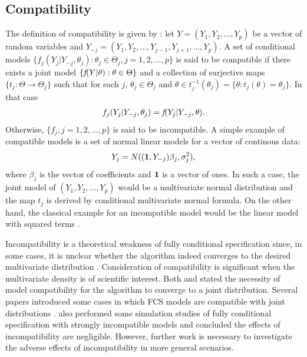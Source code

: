 	\subsection{Compatibility} 
	The definition of compatibility is given by \citet{liu2014stationary}: let $Y = (Y_1, Y_2, \dots, Y_p)$ be a vector of random variables and $Y_{-j} = (Y_1, Y_2, \dots, Y_{j-1}, Y_{j+1}, \dots, Y_{p})$. A set of conditional models $\{f_{j}(Y_j|Y_{-j}, \theta_{j}) : \theta_{j} \in \Theta_{j}, j = 1, 2, \dots, p\}$ is said to be compatible if there exists a joint model $\{\emph{f}(Y|\theta) : \theta \in \Theta\}$ and a collection of surjective maps $\{t_{j} : \Theta \to \Theta_{j}\}$ such that for each $j$, $\theta_{j} \in \Theta_{j}$ and $\theta \in t_{j}^{-1}(\theta_{j}) = \{\theta : t_{j}(\theta) = \theta_{j}\}$. In that case 
	\begin{gather*}
		f_{j}(Y_j|Y_{-j}, \theta_{j}) = \emph{f}(Y_j|Y_{-j}, \theta).
	\end{gather*}
	Otherwise, $\{f_{j}, j = 1, 2, \dots, p\}$ is said to be incompatible.
	A simple example of compatible models is a set of normal linear models for a vector of continous data: 
	\begin{gather*}
		Y_j = N((\textbf1, Y_{-j})\beta_{j}, \sigma_{j}^2), 
	\end{gather*}
	where $\beta_{j}$ is the vector of coefficients and $\textbf1$ is a vector of ones. In such a case, the joint model of $(Y_1, Y_2, \dots, Y_p)$ would be a multivariate normal distribution and the map $t_j$ is derived by conditional multivariate normal formula. On the other hand, the classical example for an incompatible model would be the linear model with squared terms \citep{liu2014stationary, bartlett2015multiple}.
	
	Incompatibility is a theoretical weakness of fully conditional specification since, in some cases, it is unclear whether the algorithm indeed converges to the desired multivariate distribution \citep{arnold1989compatible, arnold2004compatibility, heckerman2000dependency, van2006fully}. Consideration of compatibility is significant when the multivariate density is of scientific interest. Both \citet{hughes2014joint} and \citet{liu2014stationary} stated the necessity of model compatibility for the algorithm to converge to a joint distribution. Several papers introduced some cases in which FCS models are compatible with joint distributions \citep{Buuren2018, raghunathan2001multivariate}. \citet{van2006fully} also performed some simulation studies of fully conditional specification with strongly incompatible models and concluded the effects of incompatibility are negligible. However, further work is necessary to investigate the adverse effects of incompatibility in more general scenarios. 
	
